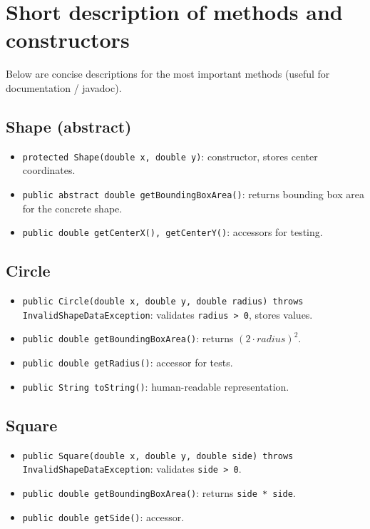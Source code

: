 \documentclass[a4paper,12pt]{article}
\begin{document}
\section{Short description of methods and constructors}
Below are concise descriptions for the most important methods (useful for documentation / javadoc).

\subsection{Shape (abstract)}
\begin{itemize}
  \item \texttt{protected Shape(double x, double y)}: constructor, stores center coordinates.
  \item \texttt{public abstract double getBoundingBoxArea()}: returns bounding box area for the concrete shape.
  \item \texttt{public double getCenterX(), getCenterY()}: accessors for testing.
\end{itemize}

\subsection{Circle}
\begin{itemize}
  \item \texttt{public Circle(double x, double y, double radius) throws InvalidShapeDataException}: validates \texttt{radius > 0}, stores values.
  \item \texttt{public double getBoundingBoxArea()}: returns $(2\cdot radius)^2$.
  \item \texttt{public double getRadius()}: accessor for tests.
  \item \texttt{public String toString()}: human-readable representation.
\end{itemize}

\subsection{Square}
\begin{itemize}
  \item \texttt{public Square(double x, double y, double side) throws InvalidShapeDataException}: validates \texttt{side > 0}.
  \item \texttt{public double getBoundingBoxArea()}: returns \texttt{side * side}.
  \item \texttt{public double getSide()}: accessor.
\end{itemize}
\end{document}
